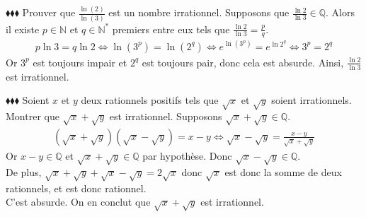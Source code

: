 \documentclass[11pt]{article}
\begin{document}
\begin{exercice}{$\blacklozenge\blacklozenge\blacklozenge$}{}
    Prouver que $\frac{\ln(2)}{\ln(3)}$ est un nombre irrationnel.
    \tcblower
    Supposons que $\frac{\ln{2}}{\ln{3}}\in\mathbb{Q}$. Alors il existe $p\in\mathbb{N}$ et $q\in\mathbb{N}^*$ premiers entre eux tels que $\frac{\ln{2}}{\ln{3}}=\frac{p}{q}$.
    \begin{align*}
        p\ln{3}=q\ln{2} \iff \ln(3^p)=\ln(2^q)\iff e^{\ln(3^p)}=e^{\ln{2^q}}\iff 3^p=2^q
    \end{align*}
    Or $3^p$ est toujours impair et $2^q$ est toujours pair, donc cela est absurde. Ainsi, $\frac{\ln2}{\ln3}$ est irrationnel.
\end{exercice}

\begin{exercice}{$\blacklozenge\blacklozenge\blacklozenge$}{}
    Soient $x$ et $y$ deux rationnels positifs tels que $\sqrt{x}$ et $\sqrt{y}$ soient irrationnels.\\
    Montrer que $\sqrt{x} + \sqrt{y}$ est irrationnel.
    \tcblower
    Supposons $\sqrt{x}+\sqrt{y}\in\mathbb{Q}$.
    \begin{align*}
        (\sqrt{x}+\sqrt{y})(\sqrt{x}-\sqrt{y})=x-y \iff \sqrt{x}-\sqrt{y}=\frac{x-y}{\sqrt{x}+\sqrt{y}}
    \end{align*}
    Or $x-y\in\mathbb{Q}$ et $\sqrt{x}+\sqrt{y}\in\mathbb{Q}$ par hypothèse. Donc $\sqrt{x}-\sqrt{y}\in\mathbb{Q}$.\\
    De plus, $\sqrt{x}+\sqrt{y}+\sqrt{x}-\sqrt{y}=2\sqrt{x}$ donc $\sqrt{x}$ est donc la somme de deux rationnels, et est donc rationnel.\\
    C'est absurde. On en conclut que $\sqrt{x}+\sqrt{y}$ est irrationnel.
\end{exercice}
\end{document}
